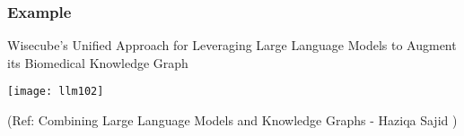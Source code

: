 \begin{frame}[fragile]\frametitle{Example}

Wisecube's Unified Approach for Leveraging Large Language Models to Augment its Biomedical Knowledge Graph

\begin{center}
\texttt{[image: llm102]}
\end{center}	

{\tiny (Ref: Combining Large Language Models and Knowledge Graphs - Haziqa Sajid )}

\end{frame}
